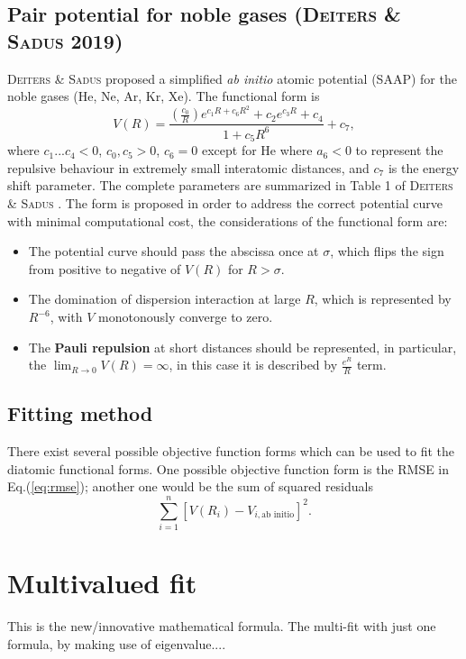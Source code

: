 \documentclass[12pt]{article}
\def\D{\displaystyle}
\begin{document}
\subsection{Pair potential for noble gases (\textsc{Deiters \& Sadus} 2019)}
\textsc{Deiters \& Sadus} \cite{idx179} proposed a simplified \textit{ab initio} atomic potential (SAAP) for the noble gases (He, Ne, Ar, Kr, Xe). The functional form is
\begin{equation}
    V(R) = \frac{\left(\D\frac{c_0}{R}\right)e^{c_1R+c_6R^2} 
    + c_2e^{c_3R} + c_4}
    {1+ c_5R^6} + c_7,
\end{equation}
where $c_1...c_4<0$, $c_0, c_5 > 0$, $c_6 = 0$ except for He where $a_6<0$ to represent the repulsive behaviour in extremely small interatomic distances, and $c_7$ is the energy shift parameter. The complete parameters are summarized in Table 1 of \textsc{Deiters \& Sadus} \cite{idx179}. The form is proposed in order to address the correct potential curve with minimal computational cost, the considerations of the functional form are:
\begin{itemize}
    \item The potential curve should pass the abscissa once at $\sigma$, which flips the sign from positive to negative of $V(R)$ for $R > \sigma$.
    \item The domination of dispersion interaction at large $R$, which is represented by $R^{-6}$, with $V$ monotonously converge to zero.
    \item The \textbf{Pauli repulsion} at short distances should be represented, in particular, the $\lim_{R \rightarrow 0} V(R) = \infty$, in this case it is described by $\D \frac{e^R}{R}$ term.
\end{itemize}


\subsection{Fitting method}
There exist several possible objective function forms which can be used to fit the diatomic functional forms. One possible objective function form is the RMSE in Eq.(\ref{eq:rmse}); another one would be the sum of squared residuals
\begin{equation}
    \sum^n_{i=1}\left[V(R_i) - V_{i,\text{ab initio}}\right]^2.
    \label{eq:sumsquaredresidual}
\end{equation}


\section{Multivalued fit}
This is the new/innovative mathematical formula.
The multi-fit with just one formula, by making use of eigenvalue....
\end{document}

